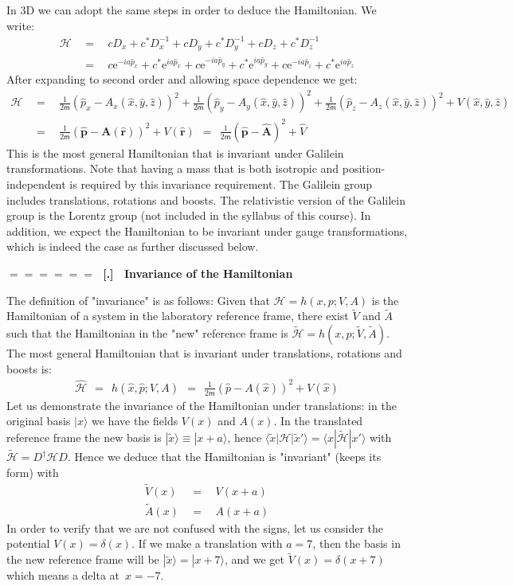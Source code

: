 \documentclass[onecolumn,fleqn]{revtex4}
\newcommand{\eexp}{\mathrm{e}^}
\newcommand{\mass}{\mathsf{m}}
\newcommand{\beq}{\begin{eqnarray}}
\newcommand{\eeq}{\end{eqnarray}}
\renewcommand{\thesubsection}{\arabic{subsection}}
\renewcommand{\thesubsubsection}{\arabic{subsubsection}}
\newcommand{\sheadC}[1]
{
\addtocounter{subsubsection}{1}
\vspace{5mm}
{\Large\bf $=\!=\!=\!=\!=\!=\;$ [\thesubsection.\thesubsubsection] \ #1}  
\nopagebreak
\phantomsection
}
\begin{document}
In 3D we can adopt the same steps in order to deduce 
the Hamiltonian. We write:
\beq
\mathcal{H} & \ \ = \ \ & cD_x + c^*D_x^{-1} + cD_y + c^* D_y^{-1}+ cD_z+c^*D_z^{-1} 
\\ \nonumber
& \ \ = \ \ & c \eexp{-ia\hat{p}_x}
+ c^* \eexp{ia\hat{p}_x}
+ c \eexp{-ia\hat{p}_y}
+ c^* \eexp{ia\hat{p}_y}
+ c \eexp{-ia\hat{p}_z}
+ c^* \eexp{ia\hat{p}_z} 
\eeq
After expanding to second order and allowing space dependence we get:
\beq \nonumber
\mathcal{H} 
& \ \ = \ \ & 
\frac{1}{2\mass}( \hat{p}_x-A_x(\hat{x}, \hat{y}, \hat{z}))^2 
+ \frac{1}{2\mass}( \hat{p}_y-A_y(\hat{x}, \hat{y}, \hat{z}))^2 
+ \frac{1}{2\mass}( \hat{p}_z-A_z(\hat{x}, \hat{y}, \hat{z}))^2 
+ V(\hat{x},\hat{y},\hat{z})
\\
& \ \ = \ \ &
\frac{1}{2\mass}( \hat{\mathbf{p}}-\mathbf{A}( \hat{\mathbf{r}}))^2+ V (\hat{\mathbf{r}}) 
\ \ = \ \
\frac{1}{2\mass}( \hat{\mathbf{p}}-\hat{\mathbf{A}} )^2+ \hat{V} 
\eeq
This is the most general Hamiltonian that is invariant 
under Galilein transformations. Note that having a mass
that is both isotropic and position-independent is 
required by this invariance requirement.  
The Galilein group includes translations, rotations and boosts. 
The relativistic version of the Galilein group is the Lorentz group 
(not included in the syllabus of this course). 
In addition, we expect the Hamiltonian to be invariant under 
gauge transformations, which is indeed the case as further 
discussed below.

 
\sheadC{Invariance of the Hamiltonian} 

The definition of "invariance" is as follows:  
Given that ${ \mathcal{H} = h(x,p; V, A) }$ 
is the Hamiltonian of a system in the laboratory reference frame, 
there exist $\tilde{V}$ and $\tilde{A}$ such that the Hamiltonian 
in the "new" reference frame is ${\tilde{\mathcal{H}}=h(x,p; \tilde{V}, \tilde{A}) }$.
The most general Hamiltonian that is invariant 
under translations, rotations and boosts is:
\beq
\hat{\mathcal{H}} \ \ = \ \ h(\hat{x},\hat{p}; V, A) 
\ \ = \ \ \frac{1}{2\mass} ( \hat{p} - A(\hat{x}) )^2 + V(\hat{x}) 
\eeq
Let us demonstrate the invariance of the Hamiltonian under translations: 
in the original basis ${|x\rangle}$ we have the fields $V(x)$ and $A(x)$. 
In the translated reference frame the new basis is ${|\tilde{x}\rangle \equiv |x+a\rangle}$, 
hence ${\langle \tilde{x} |\mathcal{H} | \tilde{x}' \rangle = \langle x |\tilde{\mathcal{H}} | x' \rangle}$ 
with ${\tilde{\mathcal{H}}=D^{\dag}\mathcal{H}D}$. Hence we deduce that 
the Hamiltonian is "invariant" (keeps its form) with   
\beq
\tilde{V}(x) \ \ &=& \ \ V(x+a) \\
\tilde{A}(x) \ \ &=& \ \ A(x+a)
\eeq
In order to verify that we are not confused with the signs, 
let us consider the potential ${V(x)=\delta (x)}$. 
If we make a translation with ${a=7}$, 
then the basis in the new reference frame will 
be ${|\tilde{x} \rangle = |x+7 \rangle }$, 
and we get ${\tilde{V}(x)=\delta {(x+7)}}$ 
which means a delta at~${x=-7}$.
\end{document}

